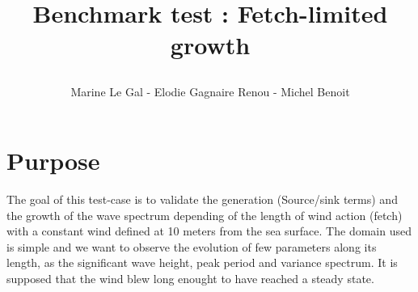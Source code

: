 \documentclass[10pt]{article}
\title{\begin{Large}
\textbf{Benchmark test : Fetch-limited growth}\\
\end{Large}}
\author{Marine Le Gal - Elodie Gagnaire Renou - Michel Benoit}
\begin{document}
\maketitle

\section{Purpose}
The goal of this test-case is to validate the generation (Source/sink terms)
and the growth of the wave spectrum depending of the length of wind action
(fetch) with a constant wind defined at 10 meters from the sea surface. The
domain used is simple and we want to observe the evolution of few parameters
along its length, as the significant wave height, peak period and variance
spectrum.
It is supposed that the wind blew long enought to have reached a steady state.
\end{document}
